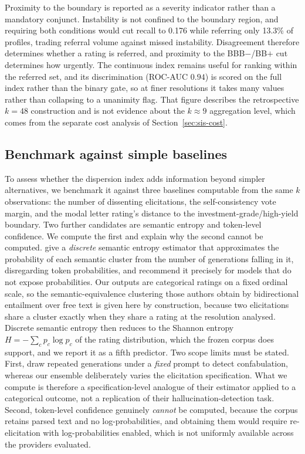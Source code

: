 \documentclass[a4paper,fleqn]{cas-sc}
\begin{document}
Proximity to the boundary is reported as a severity indicator rather than a mandatory conjunct.
Instability is not confined to the boundary region, and requiring both conditions would cut recall
to 0.176 while referring only 13.3\% of profiles, trading referral volume against missed
instability. Disagreement therefore determines whether a rating is referred, and proximity to the
BBB$-$/BB$+$ cut determines how urgently. The continuous index remains useful for ranking within the
referred set, and its discrimination (ROC-AUC $0.94$) is scored on the full index rather than the
binary gate, so at finer resolutions it takes many values rather than collapsing to a unanimity
flag. That figure describes the retrospective $k=48$ construction and is not evidence about the
$k\approx9$ aggregation level, which comes from the separate cost analysis of
Section~\ref{sec:sis-cost}.

\subsection{Benchmark against simple baselines}\label{sec:sis-baselines}
To assess whether the dispersion index adds information beyond simpler alternatives, we benchmark
it against three baselines computable from the same $k$ observations: the number of dissenting
elicitations, the self-consistency vote margin, and the modal letter rating's distance to the
investment-grade/high-yield boundary. Two further candidates are semantic entropy and token-level confidence. We compute the first and explain why the second cannot be computed. \citet{farquhar2024semantic} give a \emph{discrete} semantic
entropy estimator that approximates the probability of each semantic cluster from the number of
generations falling in it, disregarding token probabilities, and recommend it precisely for models
that do not expose probabilities. Our outputs are categorical ratings on a fixed ordinal scale, so
the semantic-equivalence clustering those authors obtain by bidirectional entailment over free text
is given here by construction, because two elicitations share a cluster exactly when they share a rating at
the resolution analysed. Discrete semantic entropy then reduces to the Shannon entropy
$H=-\sum_c p_c\log p_c$ of the rating distribution, which the frozen corpus does support, and we
report it as a fifth predictor. Two scope limits must be stated. First,
\citet{farquhar2024semantic} draw repeated generations under a \emph{fixed} prompt to detect
confabulation, whereas our ensemble deliberately varies the elicitation specification. What we
compute is therefore a specification-level analogue of their estimator applied to a categorical
outcome, not a replication of their hallucination-detection task. Second, token-level confidence
genuinely \emph{cannot} be computed, because the corpus retains parsed text and no log-probabilities, and
obtaining them would require re-elicitation with log-probabilities enabled, which is not uniformly
available across the providers evaluated.
\end{document}
